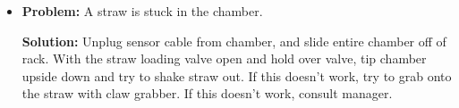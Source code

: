 \documentclass[A4,12pt]{article}
\begin{document}
\begin{itemize}
\item {\bf Problem:} A straw is stuck in the chamber.
		\begin{adjustwidth}{1cm}{}
		{\bf Solution:} Unplug sensor cable from chamber, and slide entire chamber off of rack. With the straw loading valve open and hold over valve, tip chamber upside down and try to shake straw out. If this doesn't work, try to grab onto the straw with claw grabber. If this doesn't work, consult manager.
		\end{adjustwidth}
		

\end{itemize}
\end{document}
